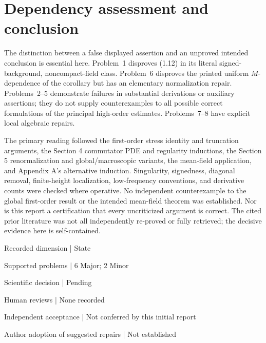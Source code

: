 \documentclass[10pt]{article}
\begin{document}
\section*{Dependency assessment and conclusion}
The distinction between a false displayed assertion and an unproved intended conclusion is essential here. Problem 1 disproves (1.12) in its literal signed-background, noncompact-field class. Problem 6 disproves the printed uniform \(M\)-dependence of the corollary but has an elementary normalization repair. Problems 2–5 demonstrate failures in substantial derivations or auxiliary assertions; they do not supply counterexamples to all possible correct formulations of the principal high-order estimates. Problems 7–8 have explicit local algebraic repairs.\par
The primary reading followed the first-order stress identity and truncation arguments, the Section 4 commutator PDE and regularity inductions, the Section 5 renormalization and global/macroscopic variants, the mean-field application, and Appendix A’s alternative induction. Singularity, signedness, diagonal removal, finite-height localization, low-frequency conventions, and derivative counts were checked where operative. No independent counterexample to the global first-order result or the intended mean-field theorem was established. Nor is this report a certification that every uncriticized argument is correct. The cited prior literature was not all independently re-proved or fully retrieved; the decisive evidence here is self-contained.\par
Recorded dimension | State\par
Supported problems | 6 Major; 2 Minor\par
Scientific decision | Pending\par
Human reviews | None recorded\par
Independent acceptance | Not conferred by this initial report\par
Author adoption of suggested repairs | Not established\par
\end{document}
